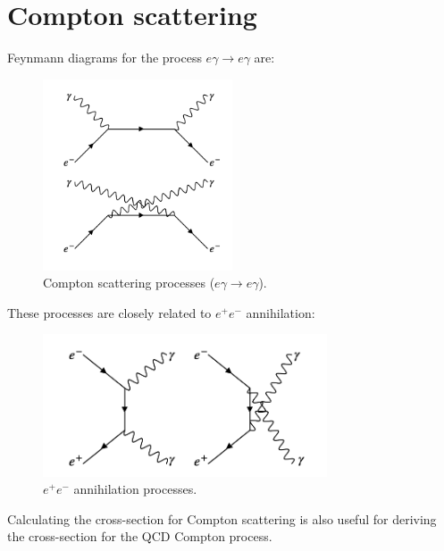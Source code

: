 \chapter{Compton scattering}

Feynmann diagrams for the process $e\gamma \to e\gamma$ are:

\begin{figure}[!htb]
  \begin{center}
    \includegraphics[width=0.5\textwidth]{images/web_feynman/image_36.png}
    \caption[Compton scattering processes]{Compton scattering processes ($e\gamma\to e\gamma$).}
    \label{fig:ch11_Compton}
  \end{center}
\end{figure}

These processes are closely related to $e^+e^-$ annihilation:

\begin{figure}[!htb]
  \begin{center}
    \includegraphics[width=0.75\textwidth]{images/web_feynman/image_37.png}
    \caption[$e^+e^-$ annihilation processes]{$e^+e^-$ annihilation processes.}
    \label{fig:ch11_EpemToGGc}
  \end{center}
\end{figure}

Calculating the cross-section for Compton scattering is also useful for deriving the cross-section for the QCD Compton process.

